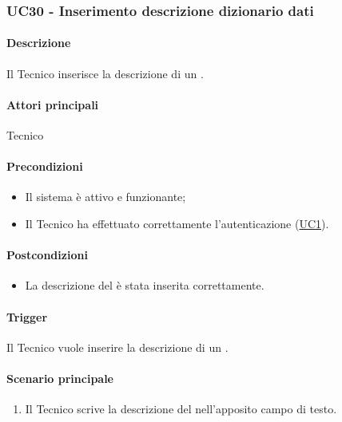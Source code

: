 \subsubsection{UC30 - Inserimento descrizione dizionario dati}\label{UC30}
\paragraph*{Descrizione}
Il Tecnico inserisce la descrizione di un .

\paragraph*{Attori principali}
Tecnico

\paragraph*{Precondizioni}
\begin{itemize}
  \item Il sistema è attivo e funzionante;
  \item Il Tecnico ha effettuato correttamente l'autenticazione (\hyperref[UC1]{UC1}).
\end{itemize}

\paragraph*{Postcondizioni}
\begin{itemize}
  \item La descrizione del  è stata inserita correttamente.
\end{itemize}

\paragraph*{Trigger}
Il Tecnico vuole inserire la descrizione di un .

\paragraph*{Scenario principale}
\begin{enumerate}
  \item Il Tecnico scrive la descrizione del  nell'apposito campo di testo.
\end{enumerate}